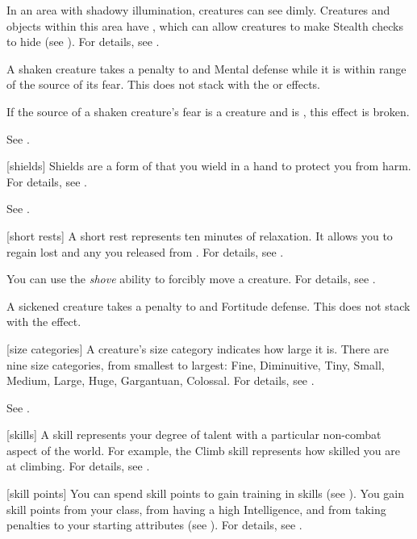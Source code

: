  In an area with shadowy illumination, creatures can see dimly.
Creatures and objects within this area have \concealment, which can allow creatures to make Stealth checks to hide (see ).
For details, see .

 A shaken creature takes a  penalty to  and Mental defense while it is within \rngmed range of the source of its fear.
This does not stack with the  or  effects.

If the source of a shaken creature's fear is a creature and is , this effect is broken.

 See .

[shields] Shields are a form of  that you wield in a hand to protect you from harm.
For details, see .

 See .

[short rests] A short rest represents ten minutes of relaxation.
It allows you to regain lost  and any  you released from .
For details, see .

 You can use the \textit{shove} ability to forcibly move a creature.
For details, see .

 A sickened creature takes a  penalty to  and Fortitude defense.
This does not stack with the  effect.

[size categories] A creature's size category indicates how large it is.
There are nine size categories, from smallest to largest: Fine, Diminuitive, Tiny, Small, Medium, Large, Huge, Gargantuan, Colossal.
For details, see .

 See .

[skills] A skill represents your degree of talent with a particular non-combat aspect of the world.
For example, the Climb skill represents how skilled you are at climbing.
For details, see .

[skill points] You can spend skill points to gain training in skills (see ).
You gain skill points from your class, from having a high Intelligence, and from taking penalties to your starting attributes (see ).
For details, see .

